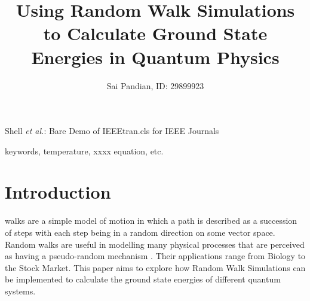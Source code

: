 \documentclass[journal]{IEEEtran}
\begin{document}
\title{Using Random Walk Simulations to Calculate Ground State Energies in Quantum Physics}

\author{Sai Pandian, ID: 29899923}%
        
{Shell \MakeLowercase{\textit{et al.}}: Bare Demo of IEEEtran.cls for IEEE Journals}

\maketitle

\begin{abstract}
\end{abstract}

\begin{IEEEkeywords}
keywords, temperature, xxxx equation, etc.
\end{IEEEkeywords}

\section{Introduction}

 walks are a simple model of motion in which a path is
described as a succession of steps with each step being in a random direction on
some vector space. Random walks are useful in modelling many physical processes
that are perceived as having a pseudo-random mechanism . Their
applications range from Biology to the Stock Market. This paper aims to explore
how Random Walk Simulations can be implemented to calculate the ground state
energies of different quantum systems. 
\end{document}
